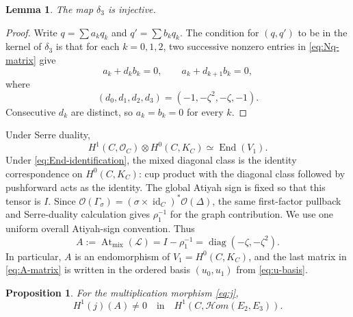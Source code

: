 \documentclass[11pt,a4paper,dvipsnames]{amsart}
\numberwithin{equation}{section}
\theoremstyle{plain}
\newtheorem{proposition}[theorem]{Proposition}
\newtheorem{lemma}[theorem]{Lemma}
\theoremstyle{definition}
\newcommand{\cO}{\mathcal O}
\newcommand{\cL}{\mathcal L}
\newcommand{\At}{\operatorname{At}}
\newcommand{\End}{\operatorname{End}}
\newcommand{\id}{\operatorname{id}}
\newcommand{\cHom}{\mathcal{H}om}
\begin{document}
\begin{lemma}\label{lem:delta-injective}
The map $\delta_3$ is injective.
\end{lemma}

\begin{proof}
Write $q=\sum a_kq_k$ and $q'=\sum b_kq_k$.  
The condition for $(q,q')$ to be in the kernel of $\delta_3$ is that
for each $k=0,1,2$, two
successive nonzero entries in \eqref{eq:Nq-matrix} give
$$
 a_k+d_kb_k=0,
 \qquad
 a_k+d_{k+1}b_k=0,
$$
where
$$
 (d_0,d_1,d_2,d_3)=(-1,-\zeta^2,-\zeta,-1).
$$
Consecutive $d_k$ are distinct, so $a_k=b_k=0$ for every $k$.
\end{proof}

Under Serre duality,
\begin{equation}\label{eq:End-identification}
H^1(C,\cO_C)\otimes H^0(C,K_C)\simeq\End(V_1).
\end{equation}
Under \eqref{eq:End-identification}, the mixed diagonal class is
the identity correspondence on $H^0(C,K_C)$: cup product with the
diagonal class followed by pushforward acts as the identity.
The global Atiyah sign is fixed so that this tensor is $I$.  Since
$\cO(\Gamma_\sigma)=(\sigma\times\id_C)^*\cO(\Delta)$,
the same first-factor pullback and Serre-duality calculation gives
$\rho_1^{-1}$ for the graph contribution.  We use one uniform overall
Atiyah-sign convention.  Thus
\begin{equation}\label{eq:A-matrix}
 A:=\At_{\mathrm{mix}}(\cL)
 =I-\rho_1^{-1}
 =\operatorname{diag}(-\zeta,-\zeta^2).
\end{equation}
In particular, $A$ is an endomorphism of
$V_1=H^0(C,K_C)$, and the last matrix in \eqref{eq:A-matrix} is written in
the ordered basis $(u_0,u_1)$ from \eqref{eq:u-basis}.

\begin{proposition}\label{prop:explicit-nonzero}
For the multiplication morphism \eqref{eq:j},
$$
 H^1(j)(A)\neq0
 \quad\text{in}\quad
 H^1\!\left(C,\cHom(E_2,E_3)\right).
$$
\end{proposition}
\end{document}
